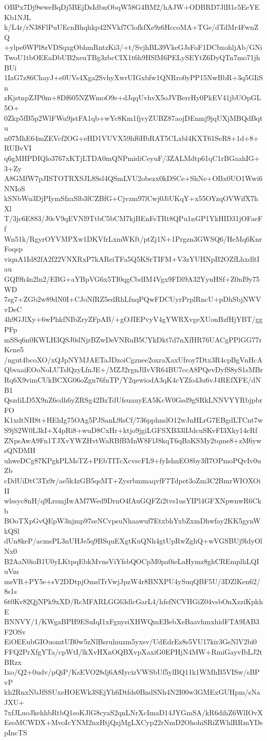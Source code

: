 OBPx7Dj9wweBqDj5BEjDsIdbnObqW58G4BM2/hAJW+ODBRD7JlB1c5EeYEKb1NJL
k/L4r/rN38FlPuUEcnBhqhkp42NVkf7ClofkfXe9z6HccoMA+TGe/dTdMr4FwnZQ
+ylpe0WPl8zVDSqxgObhmRntzKi3/+t/SvjhBL39VkeGJsFoF1DCbxohljAb/GNi
TwoU1tbOEEaDbUB2xeuTBg3zbcCIX1t6h9HSlM6PELySEYtZ6DyQTn7mo71jhBUi
1IaG7z86ChayJ+e0UVs4Xga2SvhyXwrUIGxbfw1QNRro0yPP15NwBbR+3q5GIiSn
zKjstnpZJP0m+8Df605NZWmoO9e+dJqqUvhvX5oJVBerrHy0PkEV41jbUOpGL5O+
0Zkp5fB5p2WlFWu9jstFA1qb+wYc8Km1fjvyZUBZ87aojDEnmj9jqUXjMBQdBqtu
n07MhE64mZEVcf2OG+eHD1VUVX59hf6HbRAT5CLxbl4KXT61SeR8+1d+8+RUBvVI
q6gMHPDIQlo3767xKTjLTDA0mQNPmidiCeyuF/3ZALMdtp61qC1rBGaahIG+3+Zy
A8GMfW7pJISTOTRXSJL8Ssl4QSmLVU2obezx0kDSCe+ShNe+OBx0UO1Wwi6NNIoS
kSNbWu3DjPIymSfzaSlb3fCZBfG+Cjvzm97lCwj0JiUKqY+x55OYzqOVWifX7hXl
T/3jc6E883/J0cV9qEVNl9TtbC5bCM7kjBEnFsTRt8QPu1nGP1YkHID31jOFaeFf
Wn51k/RgyrOYVMPXw1DKVfrLxmWKft/ptZj1N+1Prgzn3GWSQ6/HeMq6KnrFoqsp
viqnA1Id82fA2f22VNXRxP7kAReiTFa5Q5KSrTIFM+V3zYUHNpB2OZfLhxdltIau
GQI9h4n2ln2/EBG+aYBpVG6x5TI0qgCbdIM4Vgx9FDl9A32YyuHSf+Z0nI9y75WD
7sg7+ZGb2w89dN0I+CJoNfRZ5edRhLfnqPQwFDCUyrPrplRncU+pDhSbjNWVvDeC
4h9GJlXy+6wPhkfNIbZryZFpAB/+gOJIEPvyV4gYWRXvgeXUonBzfHjYBT/ggPFp
mSSq6n0KWLH3QSJ0dNjrBZwDeVNRuB5CYkDkt7d7nXfHR76UACgPPlGG77rKcne5
/ngut4bcoXO/xQJpNYMJAETaJDzoiCgznee2oxraXaxUfroy7Dtx3R4cpBgVnHcA
QbvaaiEOoNoLUTslQzyLfnJE+/MZJ2rgnJlIvVR64BU7ccA8PQevDyfS8yS1sMBr
Rq6X9vimCUkBCXG06oZgn76fnTP/Y2qewiodA3qK4cYZfo43u6vJ4REfXFE/dNB1
QszdiLD5X9nZ6cdh6yZRSg42BzTdUfsuauyEA5KcW0Gsd9gSRkLNNVYYRbjpbrFO
K1xdtNH8t+HEhIg75OAg5PJSanL9lsCf/736pphnslO12wJnHLrG7EBgdLTCnt7w
S9jS2W0L3kI+X4pRi8+wuD8CxHr+ktjo9jgiLGFSXB33lIJdcuSKvFI3Xky14cRf
ZNpsAwA9Fn1TJXvYWZHvtWaRBfBMnW8FlJ8kqT6qBaKSMy2tqme8+zM6ywsQNDMH
uhweDCg87KPgkPLMsTZ+PEbTITcXcvscFL9+fyIshnEO8by3fI7OPmoPQvIv0uZb
cDdUiDtC3Tz9r/ae5k4zGB5qsMT+ZysrbmmaqvfF7Tdpet3oZm3C2BmrWIOXOiII
wlssyc8nH/q9LrsmjIwAM7Wed9DrnO4fAuGQFZi2tvs1usYIPl4GFXNpwnwR6Ckb
BOoTXpGvQEpW3njmp97seNCvpsuNhaawuf7EtxbhYxbZxmDhwfay2KK5gynWkQSl
dUn8keP/acmsPL3nUHJe5q9BSquEXgtKuQNh4gtUpRwZghQ+wVGSBUj9ldyOlNx0
B2AaN0ioB1U0yLKtpqEbkMvnsViYfsbQOCpM0pa0ieLaHymz8ghCREmplhLQIuVm
meVR+PY5e+sV2DDtpjOmslTrVwjJpzW4r8BNXPU4ySuqQBF5U/3DZlKen62/8s1s
6t0Kv82QjNPk9xXD/RcMFARLGG63dlcGarL4/hfefNCVHGiZ04vsbOnXzziKpkhE
BNNVY/1/KWgaBPH9ESuIqI1xFgnysiXHWQmEBebXeBaavhmxhidFTA9IAB3F2OSv
EiOEEubGIOuomtUB0w5zNlBsrulnuzm5yxsv/UdEdrEz8s5VU17kir3GsNlV2bi0
FFQ2PrXfgYTa/cpWtI/lkXvHXnOQBXvpXaxiG0EPHjN4MW+RmiGayvIbLJ2tBRzx
Ixo/Q2+0udv/pQiP/KsEVO28dj6A8IycizVWSbUf5ylBQ11k1WMhB5VISw/sBPvP
kh2RnxNbJfSSUxeHOEWk3SEjYh6Dtfds0BndSNh4N2I00w3GMExGUHpm/sNaJXU+
7xfJLuoJkehhbRtbQ1soKJlG8cyaS2qnLNrXcImaD14JYGmSA/kR6dihZ6WlIOvX
EeoMCWDX+MvoIcYNM2nxHtjQzjMgLXCyp22rNmD2OhohiSRiZWhlRRmYDspIncTS
